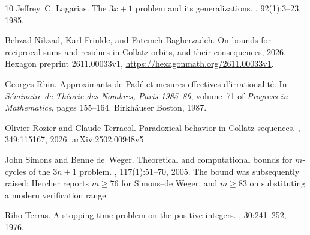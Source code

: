 \documentclass[11pt,a4paper]{article}
\theoremstyle{plain}\newtheorem{theorem}{Theorem}\newtheorem{proposition}[theorem]{Proposition}
\theoremstyle{definition}\newtheorem{example}[theorem]{Example}
\theoremstyle{remark}\newtheorem{remark}[theorem]{Remark}
\begin{document}
\begin{thebibliography}{10}
Jeffrey~C. Lagarias.
\newblock The $3x+1$ problem and its generalizations.
, 92(1):3--23, 1985.

Behzad Nikzad, Karl Frinkle, and Fatemeh Bagherzadeh.
\newblock On bounds for reciprocal sums and residues in {C}ollatz orbits, and
  their consequences, 2026.
\newblock Hexagon preprint 2611.00033v1,
  \url{https://hexagonmath.org/2611.00033v1}.

Georges Rhin.
\newblock Approximants de {P}ad\'e et mesures effectives d'irrationalit\'e.
\newblock In {\em S\'eminaire de Th\'eorie des Nombres, Paris 1985--86},
  volume~71 of {\em Progress in Mathematics}, pages 155--164. Birkh\"auser
  Boston, 1987.

Olivier Rozier and Claude Terracol.
\newblock Paradoxical behavior in {C}ollatz sequences.
, 349:115167, 2026.
\newblock arXiv:2502.00948v5.

John Simons and Benne de~Weger.
\newblock Theoretical and computational bounds for $m$-cycles of the $3n+1$
  problem.
, 117(1):51--70, 2005.
\newblock The bound was subsequently raised; Hercher \cite{hercher2023} reports
  $m\ge76$ for Simons--de Weger, and $m\ge83$ on substituting a modern
  verification range.

Riho Terras.
\newblock A stopping time problem on the positive integers.
, 30:241--252, 1976.

\end{thebibliography}
\end{document}
